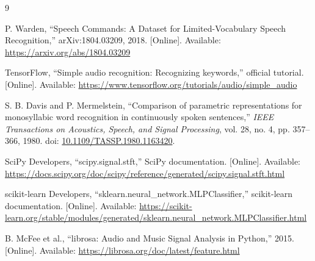 \documentclass[11pt]{article}
\begin{document}
\begin{thebibliography}{9}

P. Warden, ``Speech Commands: A Dataset for Limited-Vocabulary Speech Recognition,'' arXiv:1804.03209, 2018. [Online]. Available: \url{https://arxiv.org/abs/1804.03209}

TensorFlow, ``Simple audio recognition: Recognizing keywords,'' official tutorial. [Online]. Available: \url{https://www.tensorflow.org/tutorials/audio/simple_audio}

S. B. Davis and P. Mermelstein, ``Comparison of parametric representations for monosyllabic word recognition in continuously spoken sentences,'' \emph{IEEE Transactions on Acoustics, Speech, and Signal Processing}, vol. 28, no. 4, pp. 357--366, 1980. doi: \href{https://doi.org/10.1109/TASSP.1980.1163420}{10.1109/TASSP.1980.1163420}.

SciPy Developers, ``scipy.signal.stft,'' SciPy documentation. [Online]. Available: \url{https://docs.scipy.org/doc/scipy/reference/generated/scipy.signal.stft.html}

scikit-learn Developers, ``sklearn.neural\_network.MLPClassifier,'' scikit-learn documentation. [Online]. Available: \url{https://scikit-learn.org/stable/modules/generated/sklearn.neural_network.MLPClassifier.html}

B. McFee et al., ``librosa: Audio and Music Signal Analysis in Python,'' 2015. [Online]. Available: \url{https://librosa.org/doc/latest/feature.html}

\end{thebibliography}
\end{document}
